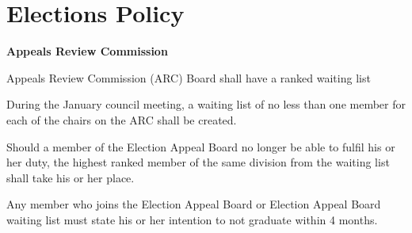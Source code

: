 \section{Elections Policy}
\begin{longenum}[ label*=\thesection.\arabic*., align=left]
 \item \textbf{Appeals Review Commission}
 \begin{longenum}[label*=\arabic*., align=left]
  \item Appeals Review Commission (ARC) Board shall have a ranked waiting list
  \item  During the January council meeting, a waiting list of no less than one member for each of the chairs on the ARC shall be created.
  \item Should a member of the Election Appeal Board no longer be able to fulfil his or her duty, the highest ranked member of the same division from the waiting list shall take his or her place.
  \item Any member who joins the Election Appeal Board or Election Appeal Board waiting list must state his or her intention to not graduate within 4 months.
  

\end{longenum}
\end{longenum}

